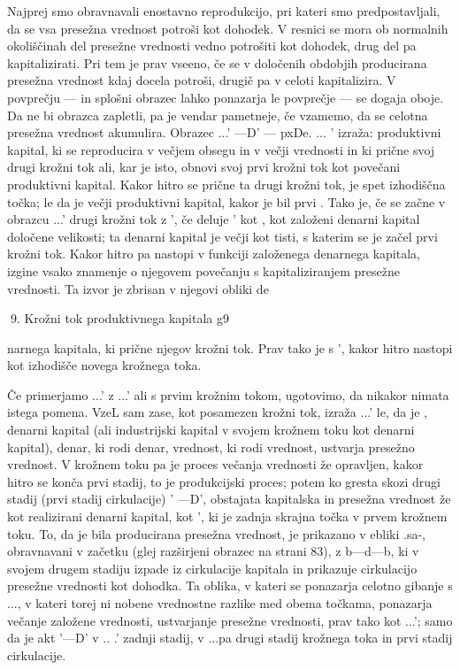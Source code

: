 \documentclass[kapital_02.tex]{subfiles}
\begin{document}
Najprej smo obravnavali enostavno reprodukcijo, pri kateri smo predpostavljali, da se vsa presežna vrednost potroši kot dohodek. V resnici se mora ob normalnih okoliščinah del presežne vrednosti vedno potrošiti kot dohodek, drug del pa kapitalizirati. Pri tem je prav vseeno, če se v določenih obdobjih producirana presežna vrednost kdaj docela potroši, drugič pa v celoti kapitalizira. V povprečju — in splošni obrazec lahko ponazarja le povprečje — se dogaja oboje. Da ne bi obrazca zapletli, pa je vendar pametneje, če vzamemo, da se celotna presežna vrednost akumulira. Obrazec \KPEP...\KPEB' —D' — pxDe. ... \KPEP' izraža: produktivni kapital, ki se reproducira v večjem obsegu in v večji vrednosti in ki prične svoj drugi krožni tok ali, kar je isto, obnovi svoj prvi krožni tok kot povečani produktivni kapital. Kakor hitro se prične ta drugi krožni tok, je \KPEP spet izhodiščna točka; le da je \KPEP večji produktivni kapital, kakor je bil prvi \KPEP. Tako je, če se začne v obrazcu \KPED...\KPED' drugi krožni tok z \KPED', če deluje \KPED' kot \KPED, kot založeni denarni kapital določene velikosti; ta denarni kapital je večji kot tisti, s katerim se je začel prvi krožni tok. Kakor hitro pa nastopi v funkciji založenega denarnega kapitala, izgine vsako znamenje o njegovem povečanju s kapitaliziranjem presežne vrednosti. Ta izvor je zbrisan v njegovi obliki de

 9. Krožni tok produktivnega kapitala g9



 narnega kapitala, ki prične njegov krožni tok. Prav tako je s \KPEP', kakor hitro nastopi kot izhodišče novega krožnega toka.

Če primerjamo \KPEP...\KPEP' z \KPED...\KPED' ali s prvim krožnim tokom, ugotovimo, da nikakor nimata istega pomena. VzeL sam zase, kot posamezen krožni tok, izraža \KPED...\KPED' le, da je \KPED, denarni kapital (ali industrijski kapital v svojem krožnem toku kot denarni kapital), denar, ki rodi denar, vrednost, ki rodi vrednost, ustvarja presežno vrednost. V krožnem toku \KPEP pa je proces večanja vrednosti že opravljen, kakor hitro se konča prvi stadij, to je produkcijski proces; potem ko gresta skozi drugi stadij (prvi stadij cirkulacije) \KPEB' —D', obstajata kapitalska in presežna vrednost že kot realizirani denarni kapital, kot \KPED', ki je zadnja skrajna točka v prvem krožnem toku. To, da je bila producirana presežna vrednost, je prikazano v ebliki \KPEP.sa-\KPEP, obravnavani v začetku (glej razširjeni obrazec na strani 83), z b—d—b, ki v svojem drugem stadiju izpade iz cirkulacije kapitala in prikazuje cirkulacijo presežne vrednosti kot dohodka. Ta oblika, v kateri se ponazarja celotno gibanje s \KPEP...\KPEP, v kateri torej ni nobene vrednostne razlike med obema točkama, ponazarja večanje založene vrednosti, ustvarjanje presežne vrednosti, prav tako kot \KPED...\KPED'; samo da je akt \KPEB'—D' v \KPED.. .\KPED' zadnji stadij, v \KPEP...\KPEP pa drugi stadij krožnega toka in prvi stadij cirkulacije.
\end{document}
